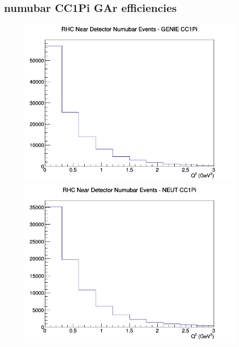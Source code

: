 \subsection{numubar CC1Pi GAr efficiencies}
\begin{figure}[h]
\includegraphics[width=\linewidth]{eff_Q2/GAr/CC1Pi_RHC_ND_numubar_Q2_GENIE.png}
\endminipage
{}
\includegraphics[width=\linewidth]{eff_Q2/GAr/CC1Pi_RHC_ND_numubar_Q2_NEUT.png}
\endminipage
{}

\end{figure}
